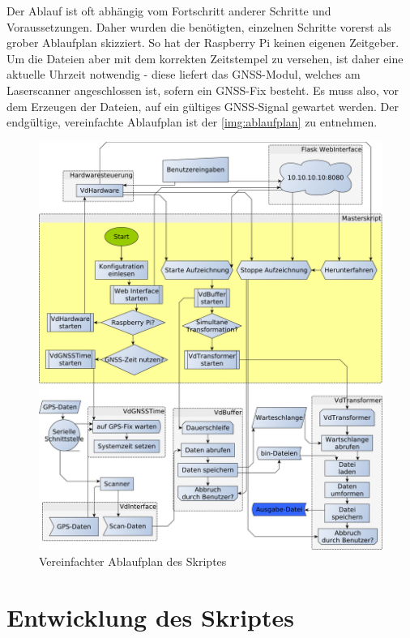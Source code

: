 \documentclass[a4paper,12pt,bibliography=totoc, listof=totoc,titlepage,pointlessnumbers]{scrreprt}
\begin{document}
Der Ablauf ist oft abhängig vom Fortschritt anderer Schritte und Voraussetzungen. Daher wurden die benötigten, einzelnen Schritte vorerst als grober Ablaufplan skizziert. So hat der Rasp\-berry Pi keinen eigenen Zeitgeber. Um die Dateien aber mit dem korrekten Zeitstempel zu versehen, ist daher eine aktuelle Uhrzeit notwendig - diese liefert das GNSS-Modul, welches am Laser\-scan\-ner angeschlossen ist, sofern ein GNSS-Fix besteht. Es muss also, vor dem Erzeugen der Dateien, auf ein gültiges GNSS-Signal gewartet werden. Der endgültige, vereinfachte Ablaufplan ist der \autoref{img:ablaufplan} zu entnehmen. 
\begin{figure}[!ht]
 \centering
 \includegraphics[width=1\textwidth]{./img/ablaufplan.pdf}
 \caption{Vereinfachter Ablaufplan des Skriptes}
 \label{img:ablaufplan}
\end{figure}

\chapter{Entwicklung des Skriptes}
\label{c:skript}
\end{document}
